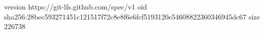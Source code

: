 version https://git-lfs.github.com/spec/v1
oid sha256:28bec593271451c121517f72c8e8f6e6fcf5193120e54608822360346945dc67
size 226738
